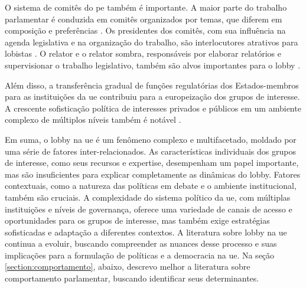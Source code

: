     O sistema de comitês do \acrshort{pe} também é importante. A maior parte do trabalho parlamentar é conduzida em comitês organizados por temas, que diferem em composição e preferências \cite{yordanova2009rationale}. Os presidentes dos comitês, com sua influência na agenda legislativa e na organização do trabalho, são interlocutores atrativos para lobistas \cite{marshall2015explaining}. O relator e o relator sombra, responsáveis por elaborar relatórios e supervisionar o trabalho legislativo, também são alvos importantes para o lobby \cite{yordanova2009rationale}.

    Além disso, a transferência gradual de funções regulatórias dos Estados-membros para as instituições da \acrshort{ue} contribuiu para a europeização dos grupos de interesse. A crescente sofisticação política de interesses privados e públicos em um ambiente complexo de múltiplos níveis também é notável \cite{richardson2000government, Coen2007}.

Em suma, o lobby na \acrshort{ue} é um fenômeno complexo e multifacetado, moldado por uma série de fatores inter-relacionados. As características individuais dos grupos de interesse, como seus recursos e expertise, desempenham um papel importante, mas são insuficientes para explicar completamente as dinâmicas do lobby. Fatores contextuais, como a natureza das políticas em debate e o ambiente institucional, também são cruciais. A complexidade do sistema político da \acrshort{ue}, com múltiplas instituições e níveis de governança, oferece uma variedade de canais de acesso e oportunidades para os grupos de interesse, mas também exige estratégias sofisticadas e adaptação a diferentes contextos. A literatura sobre lobby na \acrshort{ue} continua a evoluir, buscando compreender as nuances desse processo e suas implicações para a formulação de políticas e a democracia na \acrshort{ue}. Na seção \ref{section:comportamento}, abaixo, descrevo melhor a literatura sobre comportamento parlamentar, buscando identificar seus determinantes.